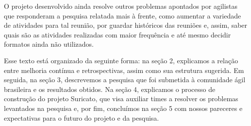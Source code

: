 O projeto desenvolvido ainda resolve outros problemas apontados por agilistas que responderam a pesquisa relatada mais à frente, como aumentar a variedade de atividades para tal reunião, por guardar históricos das reuniões e, assim, saber quais são as atividades realizadas com maior frequência e até mesmo decidir formatos ainda não utilizados.

Esse texto está organizado da seguinte forma: na seção 2, explicamos a relação entre melhoria contínua e retrospectivas, assim como sua estrutura sugerida. Em seguida, na seção 3, descrevemos a pesquisa que foi submetida à comunidade ágil brasileira e os resultados obtidos. Na seção 4, explicamos o processo de construção do projeto Suricato, que visa auxiliar times a resolver os problemas levantados na pesquisa e, por fim, concluímos na seção 5 com nossos pareceres e expectativas para o futuro do projeto e da pesquisa.
